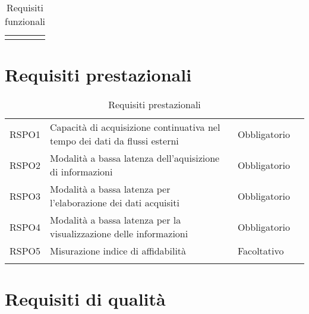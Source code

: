 {\begin{center}
\begin{longtable}{|p{3cm}|p{4cm}|p{4cm}|p{4cm}|}
			\rowcolor{white}

			\caption[Requisiti funzionali]{Requisiti funzionali}\label{4.1}\\
	\end{longtable}%

\end{center}

\section{Requisiti prestazionali}\label{RequisitiPrestazionali}
\def\tabularxcolumn#1{m{#1}}
{

	\begin{center}
		\renewcommand{\arraystretch}{1.4}
		\begin{longtable}{|p{4cm}|p{4cm}|p{4cm}|p{3cm}|}
		\hline
		\rowcolor{airforceblue}
		\makecell[c]{\textbf{Codice RS}} & \makecell[c]{\textbf{Descrizione}} & \makecell[c]{\textbf{Tipo di requisito}} & \makecell[c]{\textbf{Fonte}} \\
		\hline
		\centering RSPO1 & Capacità di acquisizione continuativa nel tempo dei dati da flussi esterni &\centering  Obbligatorio & \makecell[tc]{Capitolato$_{\scaleto{G}{3pt}}$}  \\
		\hline
		\centering RSPO2 & Modalità a bassa latenza dell'aquisizione di informazioni & \centering Obbligatorio & \makecell[tc]{Capitolato$_{\scaleto{G}{3pt}}$} \\
		\hline
		\centering RSPO3 & Modalità a bassa latenza per l'elaborazione dei dati acquisiti & \centering Obbligatorio & \makecell[tc]{Capitolato$_{\scaleto{G}{3pt}}$} \\
		\hline
		\centering RSPO4 & Modalità a bassa latenza per la visualizzazione delle informazioni & \centering Obbligatorio & \makecell[tc]{Capitolato$_{\scaleto{G}{3pt}}$} \\
		\hline
		\centering RSPO5 & Misurazione indice di affidabilità & \centering Facoltativo & 
		\makecell[tc]{Capitolato$_{\scaleto{G}{3pt}}$} \\
		\hline
		\rowcolor{white}
		
		\caption[Requisiti prestazionali]{Requisiti prestazionali}\label{4.2}\\
			\end{longtable}
	\end{center}
\section{Requisiti di qualità}\label{RequisitiDiQualita}
\def\tabularxcolumn#1{m{#1}}
{

}}}
